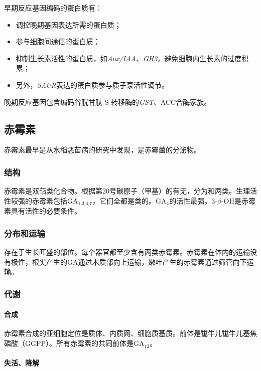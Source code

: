 早期反应基因编码的蛋白质有：

\begin{itemize}
	\item 调控晚期基因表达所需的蛋白质；
	\item 参与细胞间通信的蛋白质；
	\item 抑制生长素活性的蛋白质，如\textit{Aux/IAA}、\textit{GH3}，避免细胞内生长素的过度积累；
	\item 另外，\textit{SAUR}表达的蛋白质参与质子泵活性调节。
\end{itemize}

晚期反应基因包含编码谷胱甘肽-S-转移酶的\textit{GST}、ACC合酶家族。

\subsection{赤霉素}

赤霉素最早是从水稻恶苗病的研究中发现，是赤霉菌的分泌物。

\subsubsection{结构}

赤霉素是双萜类化合物。根据第20号碳原子（甲基）的有无，分为和两类。生理活性较强的赤霉素包括GA$_{\text{1,3,4,7}}$，它们全都是类的。GA$_{4}$的活性最强。3-$\beta$-OH是赤霉素具有活性的必要条件。

\subsubsection{分布和运输}

存在于生长旺盛的部位。每个器官都至少含有两类赤霉素。赤霉素在体内的运输没有极性，根尖产生的GA通过木质部向上运输，嫩叶产生的赤霉素通过筛管向下运输。

\subsubsection{代谢}

\paragraph{合成}

赤霉素合成的亚细胞定位是质体、内质网、细胞质基质。前体是牻牛儿牻牛儿基焦磷酸（GGPP）。所有赤霉素的共同前体是GA$_{12}$。

\paragraph{失活、降解}


